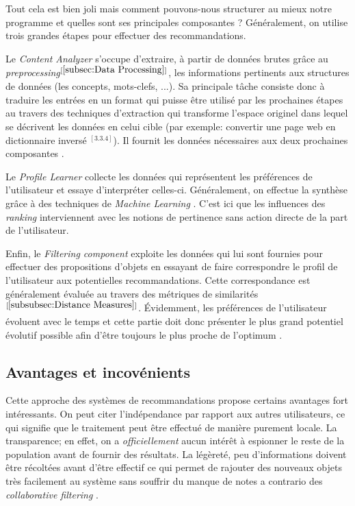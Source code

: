 Tout cela est bien joli mais comment pouvons-nous structurer au mieux notre programme et quelles sont ses principales composantes ? Généralement, on utilise trois grandes étapes pour effectuer des recommandations.

Le \textit{Content Analyzer} s'occupe d'extraire, à partir de données brutes grâce au \textit{preprocessing}$^{[\ref{subsec:Data Processing}]}$, les informations pertinents aux structures de données (les concepts, mots-clefs, ...). Sa principale tâche consiste donc à traduire les entrées en un format qui puisse être utilisé par les prochaines étapes au travers des techniques d'extraction qui transforme l'espace originel dans lequel se décrivent les données en celui cible (par exemple: convertir une page web en dictionnaire inversé $^{[3.3.4]}$). Il fournit les données nécessaires  aux deux prochaines composantes \cite{Ricci210}.

Le \textit{Profile Learner} collecte les données qui représentent les préférences de l'utilisateur et essaye d'interpréter celles-ci. Généralement, on effectue la synthèse grâce à des techniques de \textit{Machine Learning} \cite{michalski2013machine}. C'est ici que les influences des \textit{ranking} interviennent avec les notions de pertinence sans action directe de la part de l'utilisateur.

Enfin, le \textit{Filtering component} exploite les données qui lui sont fournies pour effectuer des propositions d'objets en essayant de faire correspondre le profil de l'utilisateur aux potentielles recommandations. Cette correspondance est généralement évaluée au travers des métriques de similarités$^{[\ref{subsubsec:Distance Measures}]}$. Évidemment, les préférences de l'utilisateur évoluent avec le temps et cette partie doit donc présenter le plus grand potentiel évolutif possible afin d'être toujours le plus proche de l'optimum \cite{prieto2008recommender}.

\subsection{Avantages et incovénients}

Cette approche des systèmes de recommandations propose certains avantages fort intéressants. On peut citer l'indépendance par rapport aux autres utilisateurs, ce qui signifie que le traitement peut être effectué de manière purement locale. La transparence; en effet, on a \textit{officiellement} aucun intérêt à espionner le reste de la population avant de fournir des résultats. La légèreté, peu d'informations doivent être récoltées avant d'être effectif ce qui permet de rajouter des nouveaux objets très facilement au système sans souffrir du manque de notes a contrario des \textit{collaborative filtering} \cite{jannach2010recommender}.

